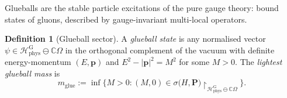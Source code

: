\documentclass[11pt,a4paper]{amsart}
\theoremstyle{definition}
\newtheorem{definition}[theorem]{Definition}
\newcommand{\C}{\mathbb{C}}
\begin{document}
Glueballs are the stable particle excitations of the pure gauge theory:
bound states of gluons, described by gauge-invariant multi-local operators.

\begin{definition}[Glueball sector]
\label{def:glueball}
A \emph{glueball state} is any normalised vector
$\psi \in \mathcal{H}_{\mathrm{phys}}^{\mathrm{G}} \ominus \C\Omega$
in the orthogonal complement of the vacuum with definite energy-momentum
$(E,\mathbf{p})$ and $E^2 - |\mathbf{p}|^2 = M^2$ for some $M > 0$.
The \emph{lightest glueball mass} is
\begin{equation}
\label{eq:glueball_mass}
  m_{\mathrm{glue}} := \inf\bigl\{M > 0 : (M,0) \in
    \sigma\!\bigl(H,\mathbf{P}\bigr)
    \restriction_{\mathcal{H}_{\mathrm{phys}}^{\mathrm{G}} \ominus \C\Omega}\bigr\}.
\end{equation}
\end{definition}
\end{document}
